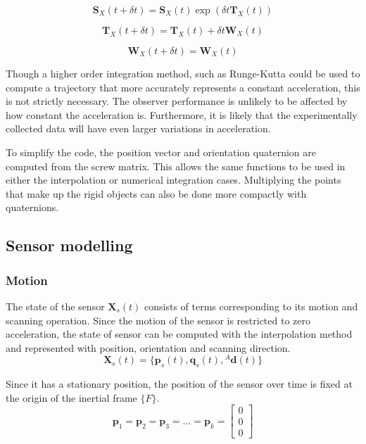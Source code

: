 \begin{equation}
	\mathbf{S}_X(t+\delta t) = \mathbf{S}_X(t)\exp({\delta t {\mathbf{T}_X(t)}})
\end{equation}

\begin{equation}
	\mathbf{T}_X(t+\delta t) = \mathbf{T}_X(t) + \delta t \mathbf{W}_X(t)
\end{equation}

\begin{equation}
	\mathbf{W}_X(t+\delta t) =\mathbf{W}_X(t)
\end{equation}

Though a higher order integration method, such as Runge-Kutta could be used to compute a trajectory that more accurately represents a constant acceleration, this is not strictly necessary. The observer performance is unlikely to be affected by how constant the acceleration is. Furthermore, it is likely that the experimentally collected data will have even larger variations in acceleration.

To simplify the code, the position vector and orientation quaternion are computed from the screw matrix. This allows the same functions to be used in either the interpolation or numerical integration cases. Multiplying the points that make up the rigid objects can also be done more compactly with quaternions.

\subsection{Sensor modelling}
\subsubsection{Motion}
The state of the sensor $\mathbf{X}_{s}(t)$ consists of terms corresponding to its motion and scanning operation. Since the motion of the sensor is restricted to zero acceleration, the state of sensor can be computed with the interpolation method and represented with position, orientation and scanning direction. 
\begin{equation}
	\mathbf{X}_{s}(t) = \{\mathbf{p}_s(t),\mathbf{q}_s(t),{^{A}\mathbf{d}(t)}\}
\end{equation}

Since it has a stationary position, the position of the sensor over time is fixed at the origin of the inertial frame $\{F\}$.
\begin{equation}
	\mathbf{p}_1 = \mathbf{p}_2 = \mathbf{p}_3 = \dots =  \mathbf{p}_k = 
	\begin{bmatrix}
		0 \\ 0 \\ 0
   	\end{bmatrix}
\end{equation}
										
